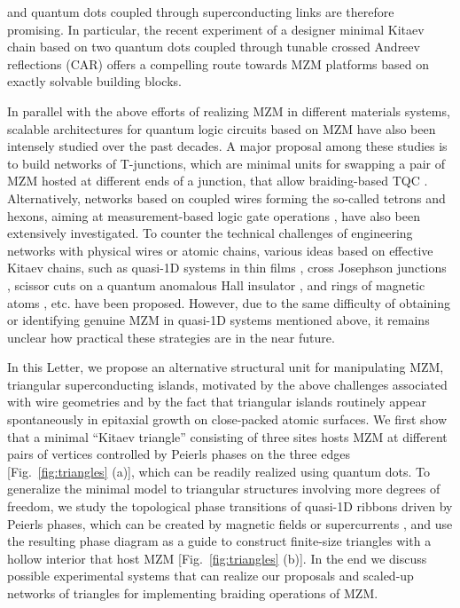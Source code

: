 \documentclass[aps,prb,twocolumn,showpacs,amsmath,amssymb,superscriptaddress]{revtex4-2}
\begin{document}
and quantum dots coupled through superconducting links \cite{sauRealizingRobustPractical2012,leijnseParityQubitsPoor2012,dvirRealizationMinimalKitaev2023} are therefore promising. In particular, the recent experiment \cite{dvirRealizationMinimalKitaev2023} of a designer minimal Kitaev chain based on two quantum dots coupled through tunable crossed Andreev reflections (CAR) offers a compelling route towards MZM platforms based on exactly solvable building blocks.

In parallel with the above efforts of realizing MZM in different materials systems, scalable architectures for quantum logic circuits based on MZM have also been intensely studied over the past decades. A major proposal among these studies is to build networks of T-junctions, which are minimal units for swapping a pair of MZM hosted at different ends of a junction, that allow braiding-based TQC \cite{aasenMilestonesMajoranaBasedQuantum2016}. Alternatively, networks based on coupled wires forming the so-called tetrons and hexons, aiming at measurement-based logic gate operations  \cite{karzigScalableDesignsQuasiparticlepoisoningprotected2017}, have also been extensively investigated. To counter the technical challenges of engineering networks with physical wires or atomic chains, various ideas based on effective Kitaev chains, such as quasi-1D systems in thin films \cite{potterMultichannelGeneralizationKitaev2010}, cross Josephson junctions \cite{zhouPhaseControlMajorana2020}, scissor cuts on a quantum anomalous Hall insulator \cite{xieCreatingLocalizedMajorana2021}, and rings of magnetic atoms \cite{liManipulatingMajoranaZero2016}, etc. have been proposed. However, due to the same difficulty of obtaining or identifying genuine MZM in quasi-1D systems mentioned above, it remains unclear how practical these strategies are in the near future.

In this Letter, we propose an alternative structural unit for manipulating MZM, triangular superconducting islands, motivated by the above challenges associated with wire geometries and by the fact that triangular islands routinely appear spontaneously in epitaxial growth \cite{pietzschSpinResolvedElectronicStructure2006} on close-packed atomic surfaces. We first show that a minimal ``Kitaev triangle'' consisting of three sites hosts MZM at different pairs of vertices controlled by Peierls phases on the three edges [Fig.~\ref{fig:triangles} (a)], which can be readily realized using quantum dots. To generalize the minimal model to triangular structures involving more degrees of freedom, we study the topological phase transitions of quasi-1D ribbons driven by Peierls phases, which can be created by magnetic fields or supercurrents \cite{romitoManipulatingMajoranaFermions2012, takasanSupercurrentinducedTopologicalPhase2022}, and use the resulting phase diagram as a guide to construct finite-size triangles with a hollow interior that host MZM  [Fig.~\ref{fig:triangles} (b)]. In the end we discuss possible experimental systems that can realize our proposals and scaled-up networks of triangles for implementing braiding operations of MZM.
\end{document}
